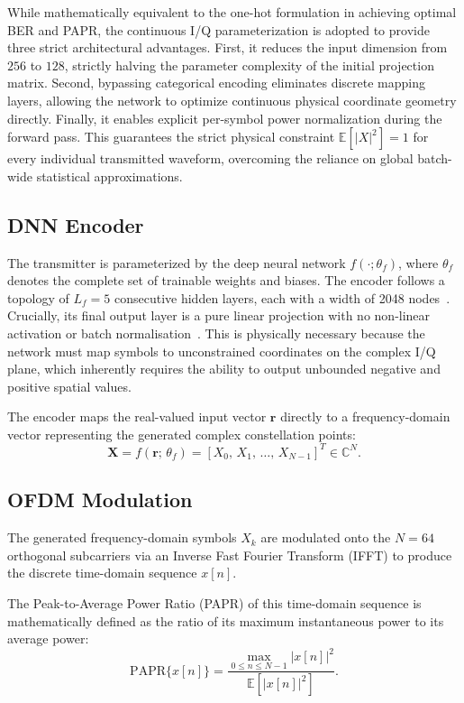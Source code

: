 While mathematically equivalent to the one-hot formulation in achieving optimal BER and PAPR, the continuous I/Q parameterization is adopted to provide three strict architectural advantages. First, it reduces the input dimension from $256$ to $128$, strictly halving the parameter complexity of the initial projection matrix. Second, bypassing categorical encoding eliminates discrete mapping layers, allowing the network to optimize continuous physical coordinate geometry directly. Finally, it enables explicit per-symbol power normalization during the forward pass. This guarantees the strict physical constraint $\mathbb{E}[|X|^2] = 1$ for every individual transmitted waveform, overcoming the reliance on global batch-wide statistical approximations.

\subsection{DNN Encoder}

The transmitter is parameterized by the deep neural network $f(\cdot; \theta_f)$, where $\theta_f$ denotes the complete set of trainable weights and biases. The encoder follows a topology of $L_f = 5$ consecutive hidden layers, each with a width of 2048 nodes~\cite{kim2017novel}. Crucially, its final output layer is a pure linear projection with no non-linear activation or batch normalisation~\cite{kim2017novel}. This is physically necessary because the network must map symbols to unconstrained coordinates on the complex I/Q plane, which inherently requires the ability to output unbounded negative and positive spatial values.

The encoder maps the real-valued input vector $\bm{r}$ directly to a frequency-domain vector representing the generated complex constellation points:
\begin{equation*}
    \bm{X} = f(\bm{r};\,\theta_f) = \left[X_0,\, X_1,\, \dots,\, X_{N-1}\right]^T \in \mathbb{C}^N.
\end{equation*}

\subsection{OFDM Modulation}

The generated frequency-domain symbols $X_k$ are modulated onto the $N = 64$ orthogonal subcarriers via an Inverse Fast Fourier Transform (IFFT) to produce the discrete time-domain sequence $x[n]$.

The Peak-to-Average Power Ratio (PAPR) of this time-domain sequence is mathematically defined as the ratio of its maximum instantaneous power to its average power:
\begin{equation*}
    \mathrm{PAPR}\{x[n]\} = \frac{\displaystyle\max_{0 \le n \le N-1} |x[n]|^2}{\mathbb{E}[|x[n]|^2]}.
\end{equation*}

